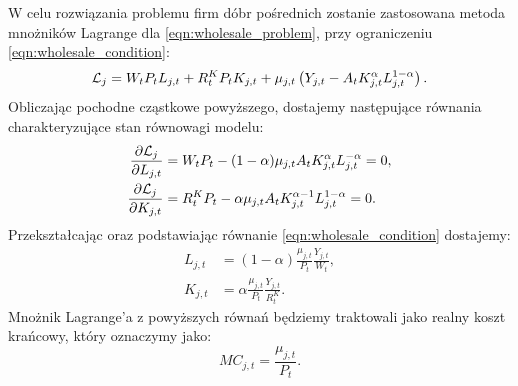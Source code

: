 W celu rozwiązania problemu firm dóbr pośrednich zostanie zastosowana metoda mnożników Lagrange dla \eqref{eqn:wholesale_problem}, przy ograniczeniu \eqref{eqn:wholesale_condition}:
\begin{equation}
    \mathcal{L}_j = W_t P_t L_{j,t} + R^K_t P_t K_{j,t} + \mu_{j,t}\left( Y_{j,t} - A_t K_{j,t}^\alpha L_{j,t}^{1-\alpha} \right).
\end{equation}
Obliczając pochodne cząstkowe powyższego, dostajemy następujące równania charakteryzujące stan równowagi modelu:
\begin{align}
    \frac{\partial \mathcal{L}_j}{\partial L_{j,t}} &= W_t P_t - (1-\alpha) \mu_{j,t} A_t K_{j,t}^\alpha L_{j,t}^{-\alpha} = 0, \\
    \frac{\partial \mathcal{L}_j}{\partial K_{j,t}} &= R^K_t P_t - \alpha \mu_{j,t} A_t K_{j,t}^{\alpha - 1} L_{j,t}^{1-\alpha} = 0.
\end{align}
Przekształcając oraz podstawiając równanie \eqref{eqn:wholesale_condition} dostajemy:
\begin{align}
    L_{j,t} &= (1-\alpha) \frac{\mu_{j,t}}{P_t} \frac{Y_{j,t}}{W_t}, \label{eq:firmNEK:L}\\
    K_{j,t} &= \alpha \frac{\mu_{j,t}}{P_t} \frac{Y_{j,t}}{R^K_t}. \label{eq:firmNEK:K}
\end{align}
Mnożnik Lagrange'a z powyższych równań będziemy traktowali jako realny koszt krańcowy, który oznaczymy jako:
\begin{equation}
    MC_{j,t} = \frac{\mu_{j,t}}{P_t}.
\end{equation}

